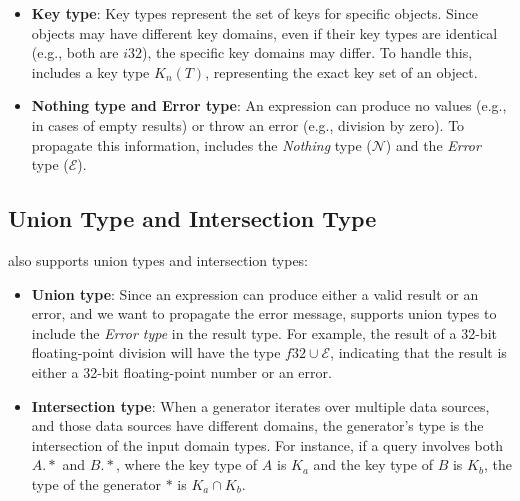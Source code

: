 \documentclass[acmsmall,nonacm]{acmart}\settopmatter{printfolios=true,printccs=false,printacmref=false}
\newcommand{\rhyme}{\text{Rhyme}\xspace}
\begin{document}
\begin{itemize}
\item \textbf{Key type}: Key types represent the set of keys for specific objects. Since objects may have different key domains, even if their key types are identical (e.g., both are $i32$), the specific key domains may differ. To handle this, \rhyme includes a key type $K_n(T)$, representing the exact key set of an object.

\item \textbf{Nothing type and Error type}: An expression can produce no values (e.g., in cases of empty results) or throw an error (e.g., division by zero). To propagate this information, \rhyme includes the \emph{Nothing} type ($\mathcal{N}$) and the \emph{Error} type ($\mathcal{E}$). \end{itemize}
\subsection{Union Type and Intersection Type}

\rhyme also supports union types and intersection types:

\begin{itemize} \item \textbf{Union type}: Since an expression can produce either a valid result or an error, and we want to propagate the error message, \rhyme supports union types to include the \emph{Error type} in the result type. For example, the result of a 32-bit floating-point division will have the type $f32 \cup \mathcal{E}$, indicating that the result is either a 32-bit floating-point number or an error.

\item \textbf{Intersection type}: When a generator iterates over multiple data sources, and those data sources have different domains, the generator's type is the intersection of the input domain types. For instance, if a query involves both $A.\ast$ and $B.\ast$, where the key type of $A$ is $K_a$ and the key type of $B$ is $K_b$, the type of the generator $\ast$ is $K_a \cap K_b$. \end{itemize}
\end{document}
